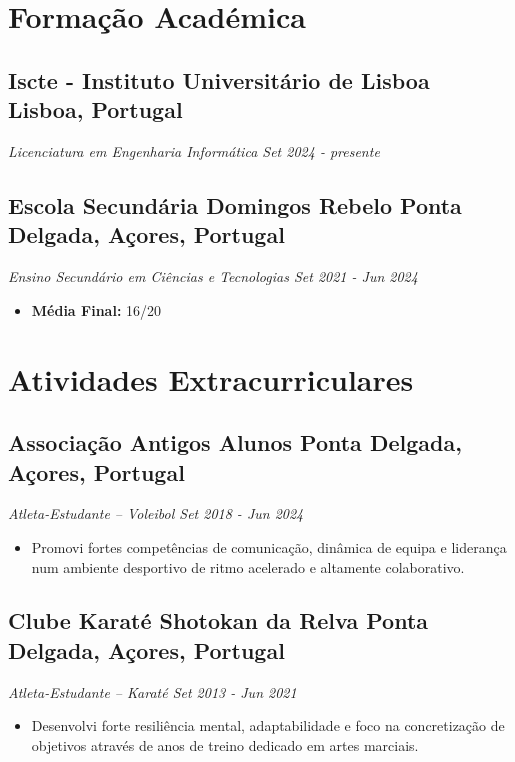 \documentclass[a4paper,10pt]{article}
\begin{document}

\section{Formação Académica}
    \subsection*{\texorpdfstring{
            \textbf{Iscte - Instituto Universitário de Lisboa} \hfill Lisboa, Portugal
        }{
            Iscte - Instituto Universitário de Lisboa -- Lisboa, Portugal
        }}
    \textit{Licenciatura em Engenharia Informática \hfill Set 2024 - presente}

    \subsection*{\texorpdfstring{
            \textbf{Escola Secundária Domingos Rebelo} \hfill Ponta Delgada, Açores, Portugal
        }{
            Escola Secundária Domingos Rebelo -- Ponta Delgada, Açores, Portugal
        }}
    \textit{Ensino Secundário em Ciências e Tecnologias \hfill Set 2021 - Jun 2024}
        \begin{itemize}
            \item \textbf{Média Final:} 16/20
        \end{itemize}


\section{Atividades Extracurriculares} 
    \subsection*{\texorpdfstring{
            \textbf{Associação Antigos Alunos} \hfill Ponta Delgada, Açores, Portugal
        }{
            Associação Antigos Alunos -- Ponta Delgada, Açores, Portugal
        }}
    \textit{Atleta-Estudante -- Voleibol \hfill Set 2018 - Jun 2024}
        \begin{itemize}
            \item Promovi fortes competências de comunicação, dinâmica de equipa e liderança num ambiente desportivo de ritmo acelerado e altamente colaborativo.
        \end{itemize}

    \subsection*{\texorpdfstring{
            \textbf{Clube Karaté Shotokan da Relva} \hfill Ponta Delgada, Açores, Portugal
        }{
            Clube Karaté Shotokan da Relva -- Ponta Delgada, Açores, Portugal
        }}
    \textit{Atleta-Estudante -- Karaté \hfill Set 2013 - Jun 2021}
        \begin{itemize}
            \item Desenvolvi forte resiliência mental, adaptabilidade e foco na concretização de objetivos através de anos de treino dedicado em artes marciais.
        \end{itemize}
\end{document}

